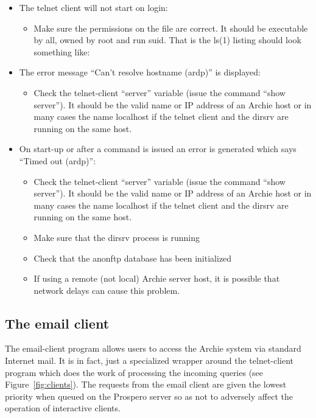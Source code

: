 \begin{itemize}
\item
The telnet client will not start on login:
\begin{itemize}
\item
Make sure the permissions on the file  are
correct. It should be executable by all, owned by root and run suid. That is
the ls(1) listing should look something like:

\end{itemize}


\item
The error message ``Can't resolve hostname (ardp)'' is displayed:

\begin{itemize}
\item
Check the telnet-client ``server'' variable (issue the command ``show
server''). It should be the valid name or IP address of an Archie host or in
many cases the name localhost if the telnet client and the dirsrv are running
on the same host.
\end{itemize}

\item
On start-up or after a command is issued an error is generated which says
``Timed out (ardp)'':

\begin{itemize}
\item
Check the telnet-client ``server'' variable (issue the command ``show
server''). It should be the valid name or IP address of an Archie host or in
many cases the name localhost if the telnet client and the dirsrv are running
on the same host.

\item
Make sure that the dirsrv process is running

\item
Check that the anonftp database has been initialized

\item
If using a remote (not local) Archie server host, it is possible that
network delays can cause this problem.
\end{itemize}
\end{itemize}


\subsection{The email client}
The email-client program allows users to access the Archie system via standard
Internet mail. It is in fact, just a specialized wrapper around the
telnet-client program which does the work of processing the incoming queries
(see Figure~\ref{fig:clients}). The requests from the email client are given
the lowest priority when queued on the Prospero server so as not to adversely
affect the operation of interactive clients.



